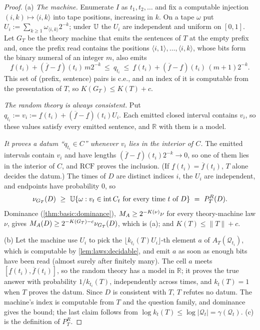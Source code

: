 \begin{proof}
(a) \emph{The machine.} Enumerate $I$ as $t_1,t_2,\dots$ and fix a computable injection $(i,k)\mapsto\langle i,k\rangle$ into tape positions, increasing in $k$. On a tape $\omega$ put $U_i:=\sum_{k\ge1}\omega_{\langle i,k\rangle}2^{-k}$; under $\mathbb{U}$ the $U_i$ are independent and uniform on $[0,1]$. Let $G_T$ be the theory machine that emits the sentences of $T$ at the empty prefix and, once the prefix read contains the positions $\langle i,1\rangle,\dots,\langle i,k\rangle$, whose bits form the binary numeral of an integer $m$, also emits
\[\underline f(t_i)+(\overline f-\underline f)(t_i)\,m2^{-k}\ \le\ q_{t_i}\ \le\ \underline f(t_i)+(\overline f-\underline f)(t_i)\,(m+1)2^{-k}.\]
This set of (prefix, sentence) pairs is c.e., and an index of it is computable from the presentation of $T$, so $K(G_T)\le K(T)+c$.

\emph{The random theory is always consistent.} Put $q_{t_i}:=v_i:=\underline f(t_i)+(\overline f-\underline f)(t_i)U_i$. Each emitted closed interval contains $v_i$, so these values satisfy every emitted sentence, and $\mathbb R$ with them is a model.

\emph{It proves a datum ``$q_{t_i}\in C$'' whenever $v_i$ lies in the interior of $C$.} The emitted intervals contain $v_i$ and have lengths $(\overline f-\underline f)(t_i)2^{-k}\to0$, so one of them lies in the interior of $C$, and $\mathrm{RCF}$ proves the inclusion. (If $\underline f(t_i)=\overline f(t_i)$, $T$ alone decides the datum.) The times of $D$ are distinct indices $i$, the $U_i$ are independent, and endpoints have probability $0$, so
\[\nu_{G_T}(D)\ \ge\ \Unif\{\omega:v_t\in\operatorname{int}C_t\text{ for every time $t$ of $D$}\}\ =\ P^R_T(D).\]
Dominance (\cref{thm:basic:dominance}), $M_{A}\ge2^{-K(\nu)}\nu$ for every theory-machine law $\nu$, gives $M_{A}(D)\ge2^{-K(G_T)-c}\nu_{G_T}(D)$, which is (a); and $K(T)\le\lVert T\rVert+c$.

(b) Let the machine use $U_i$ to pick the $\lfloor k_{t_i}(T)U_i\rfloor$-th element $a$ of $A_T(\mathcal Q_{t_i})$, which is computable by \cref{lem:laws:decidable}, and emit $a$ as soon as enough bits have been read (almost surely after finitely many). The cell $a$ meets $[\underline f(t_i),\overline f(t_i)]$, so the random theory has a model in $\mathbb R$; it proves the true answer with probability $1/k_{t_i}(T)$, independently across times, and $k_t(T)=1$ when $T$ proves the datum. Since $D$ is consistent with $T$, $T$ refutes no datum. The machine's index is computable from $T$ and the question family, and dominance gives the bound; the last claim follows from $\log k_t(T)\le\log\lvert\mathcal Q_t\rvert=\gamma(\mathcal Q_t)$. (c) is the definition of $P^R_T$.
\end{proof}

